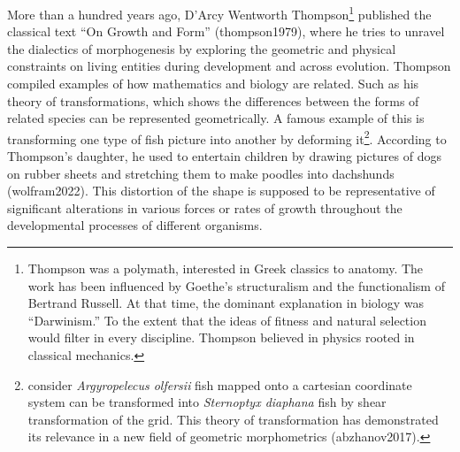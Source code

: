 \documentclass[
]{article}
\begin{document}
More than a hundred years ago, D'Arcy Wentworth Thompson\footnote{Thompson
  was a polymath, interested in Greek classics to anatomy. The work has
  been influenced by Goethe's structuralism and the functionalism of
  Bertrand Russell. At that time, the dominant explanation in biology
  was ``Darwinism.'' To the extent that the ideas of fitness and natural
  selection would filter in every discipline. Thompson believed in
  physics rooted in classical mechanics.} published the classical text
``On Growth and Form'' (thompson1979), where he tries to unravel the
dialectics of morphogenesis by exploring the geometric and physical
constraints on living entities during development and across evolution.
Thompson compiled examples of how mathematics and biology are related.
Such as his theory of transformations, which shows the differences
between the forms of related species can be represented geometrically. A
famous example of this is transforming one type of fish picture into
another by deforming it\footnote{consider \emph{Argyropelecus olfersii}
  fish mapped onto a cartesian coordinate system can be transformed into
  \emph{Sternoptyx diaphana} fish by shear transformation of the grid.
  This theory of transformation has demonstrated its relevance in a new
  field of geometric morphometrics (abzhanov2017).}. According to
Thompson's daughter, he used to entertain children by drawing pictures
of dogs on rubber sheets and stretching them to make poodles into
dachshunds (wolfram2022). This distortion of the shape is supposed to be
representative of significant alterations in various forces or rates of
growth throughout the developmental processes of different organisms.
\end{document}
